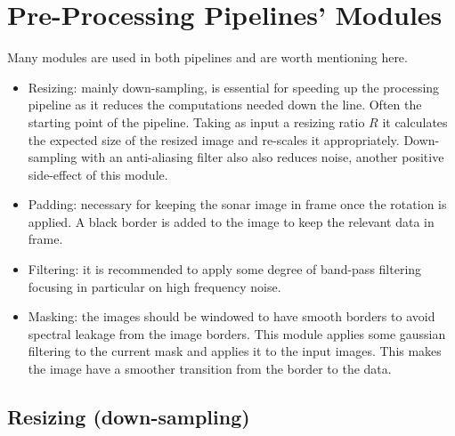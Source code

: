 \section{Pre-Processing Pipelines' Modules}

Many modules are used in both pipelines and are worth mentioning here.
\begin{itemize}
    \item Resizing: mainly down-sampling, is essential for speeding up the processing pipeline as it reduces the computations needed down the line. Often the starting point of the pipeline. Taking as input a resizing ratio \(R\) it calculates the expected size of the resized image and re-scales it appropriately. Down-sampling with an anti-aliasing filter also also reduces noise, another positive side-effect of this module.
    \item Padding: necessary for keeping the sonar image in frame once the rotation is applied. A black border is added to the image to keep the relevant data in frame.
    \item Filtering: it is recommended to apply some degree of band-pass filtering focusing in particular on high frequency noise.
    \item Masking: the images should be windowed to have smooth borders to avoid spectral leakage from the image borders. This module applies some gaussian filtering to the current mask and applies it to the input images. This makes the image have a smoother transition from the border to the data.
\end{itemize}


\subsection{Resizing (down-sampling)}

